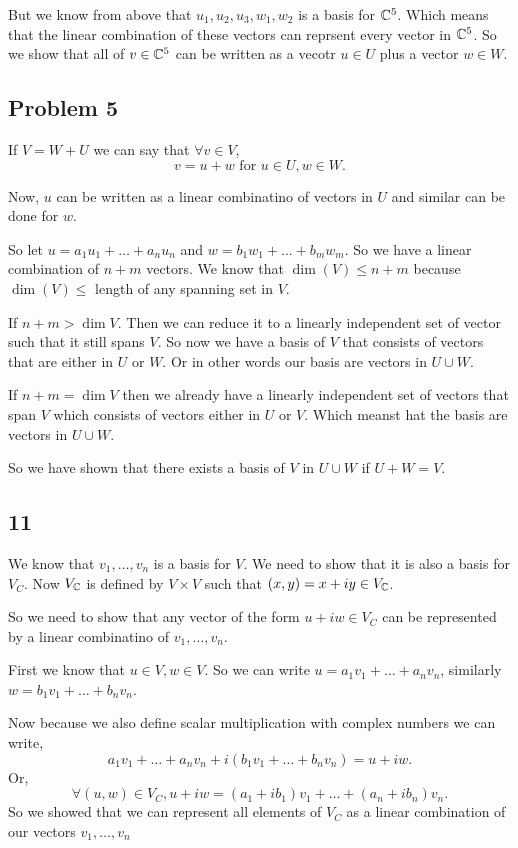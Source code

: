 \documentclass[a4paper]{report}
\begin{document}
But we know from above that  $u_1,u_2,u_3,w_1,w_2$ is a basis for $\mathbb{C}^5$. Which means that the linear combination of these vectors can reprsent every vector in  $\mathbb{C}^5$. So we show that all of  $v \in \mathbb{C}^5$ can be written as a vecotr  $u \in U$ plus a vector  $w \in W$.


\subsection*{Problem 5}
If $V = W + U$ we can say that $\forall v \in V$,  \[
    v = u + w \text{ for }u\in U, w \in W
.\] 

Now, $u$ can be written as a linear combinatino of vectors in $U$ and  similar can be done for $w$.

So let $u = a_1u_1 + \dots + a_nu_n$ and $w = b_1w_1 + \dots + b_mw_m$. So we have a linear combination of $n + m$ vectors.  We know that $\dim(V) \leq n + m$ because  $\dim(V) \leq $ length of any spanning set in  $V$.

If  $n + m > \dim V$. Then we can reduce it to a linearly independent set of vector such that it still spans  $V$. So now we have a basis of $V$ that consists of vectors that are either in $U$ or  $W$. Or in other words our basis are vectors in  $U \cup W$.

If $n + m = \dim V$ then we already have a linearly independent set of vectors that span $V$ which consists of vectors either in  $U$ or  $V$. Which meanst hat the basis are vectors in $U \cup W$.

So we have shown that there exists a basis of  $V$ in  $U \cup W$ if  $U + W = V$.

\subsection*{11}
We know that $v_1,\dots,v_n$ is a basis for $V$. We need to show that it is also a basis for  $V_C$. Now $V_{\mathbb{C}}$ is defined by $V \times V$ such that $(x,y) = x + iy \in V_{\mathbb{C}}$. 

So we need to show that any vector of the form $u + iw \in V_C$ can be represented by a linear combinatino of  $v_1,\dots,v_n$.

First we know that $u \in V, w \in V$. So we can write  $u = a_1v_1+\dots+a_nv_n$, similarly $w = b_1v_1 + \dots + b_nv_n$.

Now because we also define scalar multiplication with complex numbers we can write, \[
a_1v_1+ \dots + a_nv_n + i(b_1v_1 + \dots + b_nv_n) = u + iw
.\] 
Or, \[
    \forall (u,w) \in V_C, u + iw = (a_1+ib_1)v_1 + \dots + (a_n + ib_n)v_n
.\] 
So we showed that we can represent all elements of $V_C$ as a linear combination of our vectors  $v_1, \dots, v_n$
\end{document}
